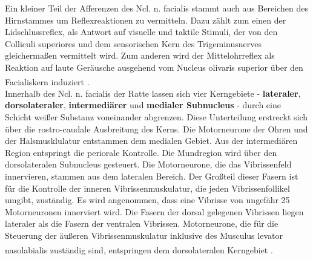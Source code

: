 Ein kleiner Teil der Afferenzen des Ncl. n. facialis stammt auch aus Bereichen des Hirnstammes um Reflexreaktionen zu vermitteln. Dazu zählt zum einen der Lidschlussreflex, als Antwort auf visuelle und taktile Stimuli, der von den Colliculi superiores und dem sensorischen Kern des Trigeminusnerves gleichermaßen vermittelt wird. Zum anderen wird der Mittelohrreflex als Reaktion auf laute Geräusche ausgehend vom Nucleus olivaris superior über den Facialiskern induziert \textsuperscript{\cite[Kap.~10]{crossman2014neuroanatomy}}. \\
Innerhalb des Ncl. n. facialis der Ratte lassen sich vier Kerngebiete - \textbf{lateraler}, \textbf{dorsolateraler}, \textbf{intermediärer} und \textbf{medialer Subnucleus} - durch eine Schicht weißer Substanz voneinander abgrenzen. Diese Unterteilung erstreckt sich über die rostro-caudale Ausbreitung des Kerns. Die Motorneurone der Ohren und der Halsmusklulatur entstammen dem medialen Gebiet. Aus der intermediären Region entspringt die periorale Kontrolle. Die Mundregion wird über den dorsolateralen Subnucleus gesteuert. Die Motorneurone, die das Vibrissenfeld innervieren, stammen aus dem lateralen Bereich. Der Großteil dieser Fasern ist für die Kontrolle der inneren Vibrissenmuskulatur, die jeden Vibrissenfollikel umgibt, zuständig. Es wird angenommen, dass eine Vibrisse von ungefähr 25 Motorneuronen innerviert wird. Die Fasern der dorsal gelegenen Vibrissen liegen lateraler als die Fasern der ventralen Vibrissen. Motorneurone, die für die Steuerung der äußeren Vibrissenmuskulatur inklusive des Musculus levator nasolabialis	zuständig sind, entspringen dem dorsolateralen Kerngebiet \textsuperscript{\cite[Kap.~11]{paxinos2014rat}}.   


